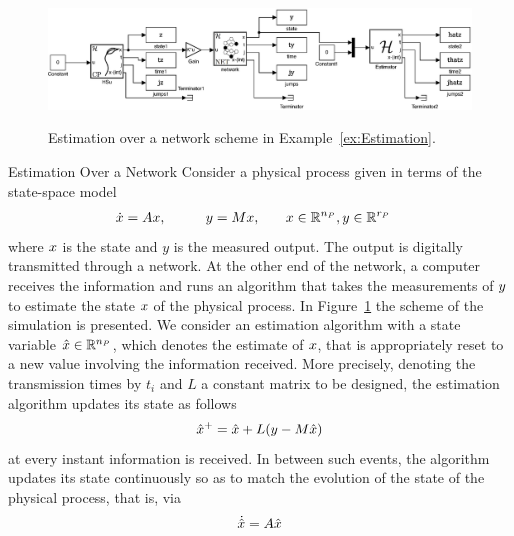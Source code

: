 \label{ex:EstimationOverNetwork}
\begin{figure}
  \begin{center}
    {\includegraphics[width=1.0\textwidth]{figures/Simulink/NetworkExample.eps}}
   \caption{Estimation over a network scheme in Example~\ref{ex:Estimation}.}
\label{fig:NetworkExample}
  \end{center}
\end{figure}

\begin{example}{Estimation Over a Network}\label{ex:Estimation}
Consider a physical process given in terms of the state-space model
\begin{equation}
\begin{aligned}
\label{eqn:PlantForEstimation}
&\xpdot=A \xp ,\qquad 
&\yp= M \xp, \qquad & \xp \in \reals^{n_P}, \yp \in \reals^{r_P}
\end{aligned}
\end{equation}
where $x$ is the state and $y$ is the measured output.
The output is digitally transmitted through a network.
At the other end of the network, a computer receives the information
and runs an algorithm that takes the measurements of 
$y$ to estimate the state $x$ of the physical process.
In Figure~\ref{fig:NetworkExample} the scheme of the simulation is presented.
We consider an estimation algorithm with a state variable $\hat{x} \in {\mathbb R}^{n_P}$,
which denotes the estimate of $x$, that is appropriately reset
to a new value involving the information received.
More precisely, denoting the transmission times by $t_i$
and $L$ a constant matrix to be designed,
the estimation algorithm updates its state as follows
\begin{equation}\label{eqn:HatXpUpdateExample}
\hat\xp^+=\hat\xp+L(\yp-M\hat\xp)
\end{equation}
at every instant information is received.
In between such events, the algorithm
updates its state continuously so as to match the evolution
of the state of the physical process, that is, via
\begin{equation}\label{eqn:HatXpFlowsExample}
\dot{\hat\xp} = A \hat\xp
\end{equation}

\end{example}
